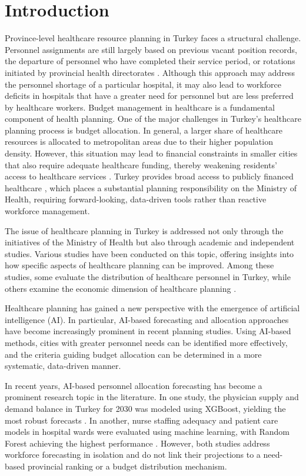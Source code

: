 \documentclass[final, 9pt, twocolumn]{saucis}
\begin{document}
\section{Introduction}  %
Province-level healthcare resource planning in Turkey faces a structural challenge. Personnel assignments are still largely based on previous vacant position records, the departure of personnel who have completed their service period, or rotations initiated by provincial health directorates \cite{intro4}. Although this approach may address the personnel shortage of a particular hospital, it may also lead to workforce deficits in hospitals that have a greater need for personnel but are less preferred by healthcare workers. Budget management in healthcare is a fundamental component of health planning. One of the major challenges in Turkey's healthcare planning process is budget allocation. In general, a larger share of healthcare resources is allocated to metropolitan areas due to their higher population density. However, this situation may lead to financial constraints in smaller cities that also require adequate healthcare funding, thereby weakening residents' access to healthcare services \cite{intro5}. Turkey provides broad access to publicly financed healthcare \cite{intro3}, which places a substantial planning responsibility on the Ministry of Health, requiring forward-looking, data-driven tools rather than reactive workforce management.

The issue of healthcare planning in Turkey is addressed not only through the initiatives of the Ministry of Health but also through academic and independent studies. Various studies have been conducted on this topic, offering insights into how specific aspects of healthcare planning can be improved. Among these studies, some evaluate the distribution of healthcare personnel in Turkey, while others examine the economic dimension of healthcare planning \cite{intro6, intro7}.

Healthcare planning has gained a new perspective with the emergence of artificial intelligence (AI). In particular, AI-based forecasting and allocation approaches have become increasingly prominent in recent planning studies. Using AI-based methods, cities with greater personnel needs can be identified more effectively, and the criteria guiding budget allocation can be determined in a more systematic, data-driven manner.

In recent years, AI-based personnel allocation forecasting has become a prominent research topic in the literature. In one study, the physician supply and demand balance in Turkey for 2030 was modeled using XGBoost, yielding the most robust forecasts \cite{intro8}. In another, nurse staffing adequacy and patient care models in hospital wards were evaluated using machine learning, with Random Forest achieving the highest performance \cite{intro9}. However, both studies address workforce forecasting in isolation and do not link their projections to a need-based provincial ranking or a budget distribution mechanism.
\end{document}
